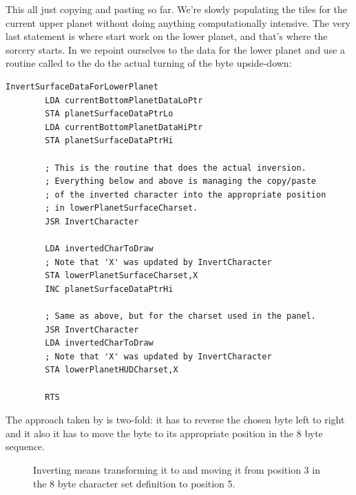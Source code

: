 This all just copying and pasting so far. We're slowly populating the tiles for the current upper planet without doing
anything computationally intensive. The very last statement is where start work on the lower planet, and that's where
the sorcery starts. In  we repoint ourselves to the data for the lower planet
and use a routine called  to the do the actual turning of the byte upside-down:

\begin{lstlisting}[caption=\icode{InvertSurfaceDataForLowerPlanet}.]
InvertSurfaceDataForLowerPlanet
        LDA currentBottomPlanetDataLoPtr
        STA planetSurfaceDataPtrLo
        LDA currentBottomPlanetDataHiPtr
        STA planetSurfaceDataPtrHi

        ; This is the routine that does the actual inversion.
        ; Everything below and above is managing the copy/paste
        ; of the inverted character into the appropriate position
        ; in lowerPlanetSurfaceCharset.
        JSR InvertCharacter

        LDA invertedCharToDraw
        ; Note that 'X' was updated by InvertCharacter
        STA lowerPlanetSurfaceCharset,X
        INC planetSurfaceDataPtrHi

        ; Same as above, but for the charset used in the panel.
        JSR InvertCharacter
        LDA invertedCharToDraw
        ; Note that 'X' was updated by InvertCharacter
        STA lowerPlanetHUDCharset,X

        RTS
\end{lstlisting}

The approach taken by  is two-fold: it has to reverse the chosen byte left to right and 
it also it has to move the byte to its appropriate position in the 8 byte sequence.

\begin{figure}[H]
{
  \setlength{\tabcolsep}{3.0pt}
  \setlength\cmidrulewidth{\heavyrulewidth} %
    \begin{adjustbox}{width=10cm,center}
  \begin{subfigure}{0.3\textwidth}
  
  \end{subfigure}
  \begin{subfigure}{0.3\textwidth}
  
  \end{subfigure}
  \end{adjustbox}
}\caption[]{Inverting  means transforming it to  and moving it from position 3 in the
  8 byte character set definition to position 5.}
\end{figure}


